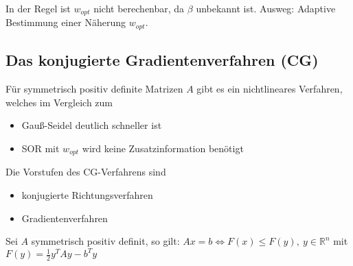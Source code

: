 \begin{remark}
	In der Regel ist $w_{opt}$ nicht berechenbar, da $\beta$ unbekannt ist. Ausweg: Adaptive Bestimmung einer Näherung $w_{opt}$.
\end{remark}

\subsection{Das konjugierte Gradientenverfahren (CG)}
Für symmetrisch positiv definite Matrizen $A$ gibt es ein nichtlineares Verfahren, welches im Vergleich zum
\begin{itemize}
	\item Gauß-Seidel deutlich schneller ist
	\item SOR mit $w_{opt}$ wird keine Zusatzinformation benötigt
\end{itemize}
Die Vorstufen des CG-Verfahrens sind
\begin{itemize}
	\item konjugierte Richtungsverfahren
	\item Gradientenverfahren
\end{itemize}

\begin{theorem}
	Sei $A$ symmetrisch positiv definit, so gilt: $Ax=b \Leftrightarrow F(x)\leq F(y),\ y\in \mathbb{R}^{n}$ 
	mit $F(y)=\frac{1}{2}y^{T}Ay-b^{T}y$
\end{theorem}